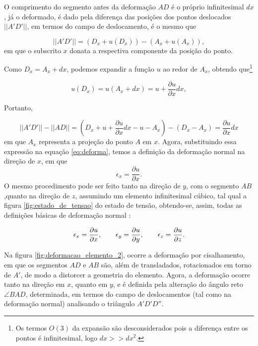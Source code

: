 O comprimento do segmento antes da deformação $AD$ é o próprio infinitesimal $dx$, já o deformado, é dado pela diferença das posições dos pontos deslocados $||A'D'||$, em termos do campo de deslocamento, é o mesmo que

\begin{equation}
    ||A'D'|| = (D_x + u(D_x)) - (A_x + u(A_x)),
\end{equation}
em que o subscrito $x$ donata a respectiva componente da posição do ponto.

Como $D_x = A_x + dx$, podemos expandir a função $u$ ao redor de $A_x$, obtendo que\footnote{Os termos $O(3)$ da expansão são desconsiderados pois a diferença entre os pontos é infinitesimal, logo $dx >> dx^2$.}

\begin{equation}
    u(D_x) = u(A_x + dx) = u + \frac{\partial u}{\partial x} dx,
\end{equation}

Portanto,

\begin{equation}
    ||A'D'|| - ||AD|| = (D_x + u + \frac{\partial u}{\partial x} dx - u - A_x) - (D_x - A_x) = \frac{\partial u}{\partial x} dx
\end{equation}
em que $A_x$ representa a projeção do ponto $A$ em $x$.
Agora, substituindo essa expressão na equação \ref{eq:deforma}, temos a definição da deformação normal na direção de $x$, em que
\begin{equation}
    \epsilon_x = \frac{\partial u}{\partial x}.
\end{equation}
O mesmo procedimento pode ser feito tanto na direção de $y$, com o segmento $AB$,quanto na direção de $z$, assumindo um elemento infinitesimal cúbico, tal qual a figura \ref{fig:estado_de_tensao} do estado de tensão, obtendo-se, assim, todas as definições básicas de deformação normal \cite{popov}:

\begin{equation}
    \epsilon_x = \frac{\partial u}{\partial x}, \qquad \epsilon_y = \frac{\partial u}{\partial y}, \qquad \epsilon_z = \frac{\partial u}{\partial z}. \\
\end{equation}  

Na figura \ref{fig:deformacao_elemento_2}, ocorre a deformação por cisalhamento, em que os segmentos $AD$ e $AB$ são, além de transladados, rotacionados em torno de $A'$, de modo a distorcer a geometria do elemento. Agora, a deformação ocorre tanto na direção em $x$, quanto em $y$, e é definida pela alteração do ângulo reto $\angle BAD$, determinada, em termos do campo de deslocamentos (tal como na deformação normal) analisando o triângulo $A'D'D''$.

